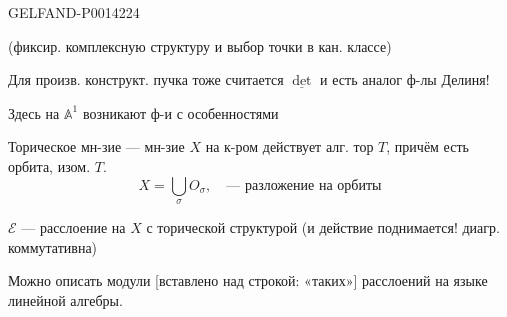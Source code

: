 \begin{GelfandAdjacentEvidence}{GELFAND-P001422}{4}


(фиксир. комплексную структуру и выбор точки в кан. классе)

Для произв. конструкт. пучка тоже считается \(\underline{\det}\) и есть аналог ф-лы Делиня!

Здесь на \(\mathbb A^1\) возникают ф-и с особенностями

\qquad {}

Торическое мн-зие — мн-зие \(X\) на к-ром действует алг. тор \(T\),
причём есть орбита, изом. \(T\).
\[
X=\bigcup_\sigma O_\sigma,\quad\text{— разложение на орбиты}
\]

\(\mathcal E\) — расслоение на \(X\) с торической структурой
(и действие поднимается! диагр. коммутативна)

\end{GelfandAdjacentEvidence}


Можно описать модули [вставлено над строкой: «таких»] расслоений на языке линейной алгебры.


